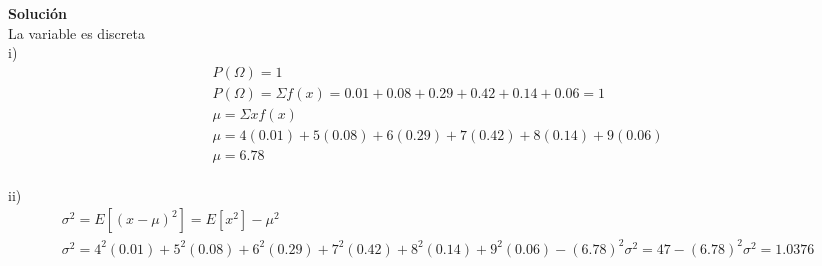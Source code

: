 \begin{enumerate}
\begin{center}
\begin{tabular}{|c|c|c|c|c|c|c|}
        \hline 
    \end{tabular}
    \end{center}
    \textbf{Solución}\\
    La variable es discreta\\
    i)
    \begin{gather*}
    P(\Omega) = 1\\
    P(\Omega) = \Sigma f(x) = 0.01 + 0.08 + 0.29 + 0.42 + 0.14 + 0.06 = 1\\
    \mu = \Sigma xf(x)\\
    \mu = 4(0.01) + 5(0.08) + 6(0.29) + 7(0.42) + 8(0.14) + 9(0.06)\\
    \mu = 6.78	
    \end{gather*}\\
    ii)
    \begin{gather*}
    \sigma^2 = E[(x - \mu)^2] = E[x^2] - \mu ^2\\
    \sigma^2 = 4^2(0.01) + 5^2(0.08) + 6^2(0.29) + 7^2(0.42) + 8^2(0.14) + 9^2(0.06) - (6.78)^2
    \sigma^2 = 47 - (6.78)^2
    \sigma^2 = 1.0376
    \end{gather*}\\
    

\end{enumerate}
